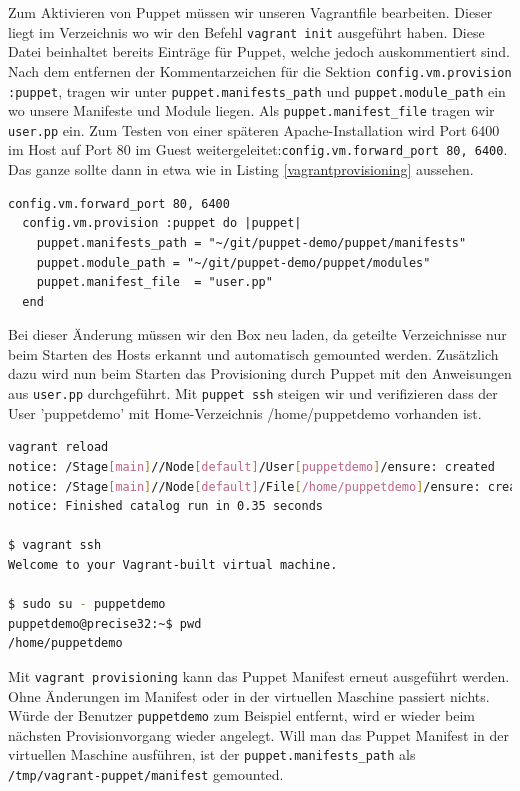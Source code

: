 \documentclass[12pt,a4paper,ngerman]{article}
\begin{document}
Zum Aktivieren von Puppet müssen wir unseren Vagrantfile bearbeiten. Dieser liegt im Verzeichnis wo wir den Befehl \lstinline$vagrant init$ ausgeführt haben. Diese Datei beinhaltet bereits Einträge für Puppet, welche jedoch auskommentiert sind. Nach dem entfernen der Kommentarzeichen für die Sektion \lstinline$config.vm.provision :puppet$, tragen wir unter \lstinline$puppet.manifests_path$ und \lstinline$puppet.module_path$ ein wo unsere Manifeste und Module liegen. Als \lstinline$puppet.manifest_file$ tragen wir \lstinline$user.pp$ ein. Zum Testen von einer späteren Apache-Installation wird Port 6400 im Host auf Port 80 im Guest weitergeleitet:\lstinline$config.vm.forward_port 80, 6400$. Das ganze sollte dann in etwa wie in Listing \ref{vagrantprovisioning} aussehen.
  
\begin{lstlisting}[language=vagrant,caption=Puppet Provisioning in Vagrantfile konfigurieren, label=vagrantprovisioning]
  config.vm.forward_port 80, 6400  
  config.vm.provision :puppet do |puppet|
    puppet.manifests_path = "~/git/puppet-demo/puppet/manifests"
    puppet.module_path = "~/git/puppet-demo/puppet/modules"
    puppet.manifest_file  = "user.pp"
  end
\end{lstlisting} 

Bei dieser Änderung müssen wir den Box neu laden, da geteilte Verzeichnisse nur beim Starten des Hosts erkannt und automatisch gemounted werden. Zusätzlich dazu wird nun beim Starten das Provisioning durch Puppet mit den Anweisungen aus \lstinline$user.pp$ durchgeführt. Mit \lstinline$puppet ssh$ steigen wir und verifizieren dass der User 'puppetdemo' mit Home-Verzeichnis /home/puppetdemo vorhanden ist.

\begin{lstlisting}[language=sh,caption=Vagrant Box neu laden, label=vagrant-reload]
vagrant reload
notice: /Stage[main]//Node[default]/User[puppetdemo]/ensure: created
notice: /Stage[main]//Node[default]/File[/home/puppetdemo]/ensure: created
notice: Finished catalog run in 0.35 seconds

$ vagrant ssh
Welcome to your Vagrant-built virtual machine.

$ sudo su - puppetdemo
puppetdemo@precise32:~$ pwd
/home/puppetdemo
\end{lstlisting}

Mit \lstinline$vagrant provisioning$ kann das Puppet Manifest erneut ausgeführt werden. Ohne Änderungen im Manifest oder in der virtuellen Maschine passiert nichts. Würde der Benutzer \lstinline$puppetdemo$ zum Beispiel entfernt, wird er wieder beim nächsten Provisionvorgang wieder angelegt.
Will man das Puppet Manifest in der virtuellen Maschine ausführen, ist der \lstinline$puppet.manifests_path$ als \lstinline$/tmp/vagrant-puppet/manifest$ gemounted.
\end{document}
